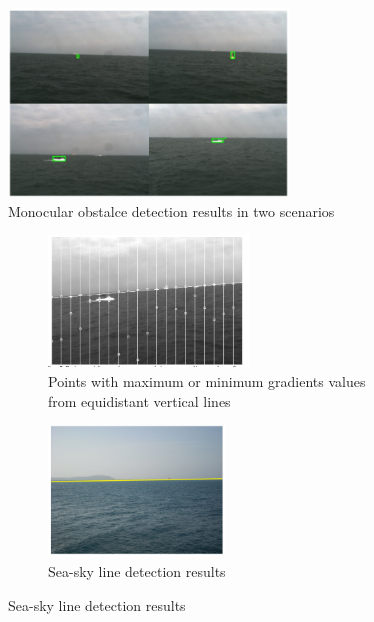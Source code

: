 \documentclass[12pt]{article}
\begin{document}
      \begin{figure}
            \centering
            \includegraphics[height=5cm]{./Images/Wang/monocular}
            \caption{Monocular obstalce detection results in two scenarios}
            \label{fig:monocular}
      \end{figure}

      \begin{figure}
            \centering

            \begin{subfigure}[b]{.40\linewidth}
            \includegraphics[width=\linewidth, height= 3.5cm]{./Images/Wang/line-fitting}
            \caption{Points with maximum or minimum gradients values from equidistant vertical lines}\label{fig:line-fitting}
            \end{subfigure}
            \begin{subfigure}[b]{.40\linewidth}
            \includegraphics[width=\linewidth, height= 3.5cm]{./Images/Wang/horizon}
            \caption{Sea-sky line detection results}\label{fig:horizon}
            \end{subfigure}


\end{figure}
\end{document}
